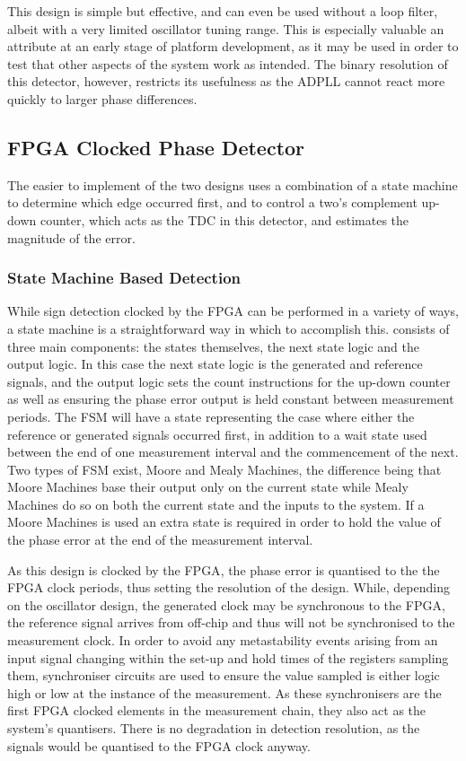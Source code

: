 This design is simple but effective, and can even be used without a loop filter, albeit with a very limited oscillator tuning range. This is especially valuable an attribute at an early stage of platform development, as it may be used in order to test that other aspects of the system work as intended. The binary resolution of this detector, however, restricts its usefulness as the \ac{ADPLL} cannot react more quickly to larger phase differences.

\subsection{\acs{FPGA} Clocked Phase Detector}
The easier to implement of the two designs uses a combination of a state machine to determine which edge occurred first, and to control a two's complement up-down counter, which acts as the \ac{TDC} in this detector, and estimates the magnitude of the error.

\subsubsection{State Machine Based Detection}
While sign detection clocked by the \ac{FPGA} can be performed in a variety of ways, a state machine is a straightforward way in which to accomplish this.  consists of three main components: the states themselves, the next state logic and the output logic. In this case the next state logic is the generated and reference signals, and the output logic sets the count instructions for the up-down counter as well as ensuring the phase error output is held constant between measurement periods. The \ac{FSM} will have a state representing the case where either the reference or generated signals occurred first, in addition to a wait state used between the end of one measurement interval and the commencement of the next. Two types of \ac{FSM} exist, Moore and Mealy Machines, the difference being that Moore Machines base their output only on the current state while Mealy Machines do so on both the current state and the inputs to the system. If a Moore Machines is used an extra state is required in order to hold the value of the phase error at the end of the measurement interval.

As this design is clocked by the \ac{FPGA}, the phase error is quantised to the the \ac{FPGA} clock periods, thus setting the resolution of the design. While, depending on the oscillator design, the generated clock may be synchronous to the \ac{FPGA}, the reference signal arrives from off-chip and thus will not be synchronised to the measurement clock. In order to avoid any metastability events arising from an input signal changing within the set-up and hold times of the registers sampling them, synchroniser circuits are used to ensure the value sampled is either logic high or low at the instance of the measurement. As these synchronisers are the first \ac{FPGA} clocked elements in the measurement chain, they also act as the system's quantisers. There is no degradation in detection resolution, as the signals would be quantised to the \ac{FPGA} clock anyway.

